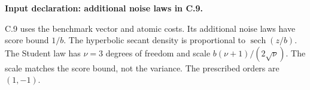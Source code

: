 

\textbf{Input declaration: additional noise laws in C.9.}

C.9 uses the benchmark vector and atomic costs. Its additional noise
laws have score bound \(1/b\). The hyperbolic secant density is
proportional to \(\operatorname{sech}(z/b)\). The Student law has
\(\nu=3\) degrees of freedom and scale \(b(\nu+1)/(2\sqrt{\nu})\). The
scale matches the score bound, not the variance. The prescribed orders
are \((1,-1)\).
